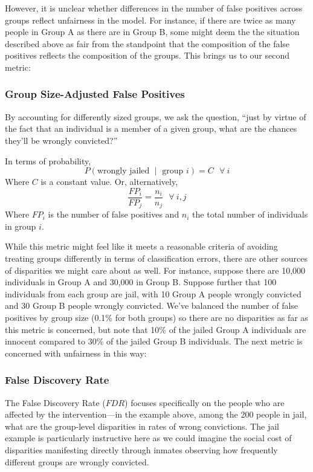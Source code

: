 \documentclass[]{krantz}
\begin{document}
However, it is unclear whether differences in the number of false
positives across groups reflect unfairness in the model. For instance,
if there are twice as many people in Group A as there are in Group B,
some might deem the the situation described above as fair from the
standpoint that the composition of the false positives reflects the
composition of the groups. This brings us to our second metric:

\subsubsection{Group Size-Adjusted False
Positives}\label{group-size-adjusted-false-positives}

By accounting for differently sized groups, we ask the question, ``just
by virtue of the fact that an individual is a member of a given group,
what are the chances they'll be wrongly convicted?''

In terms of probability,
\[P(\textrm{wrongly jailed $\mid$ group $i$}) = C~~~\forall~i\] Where
\(C\) is a constant value. Or, alternatively,
\[\frac{FP_i}{FP_j} = \frac{n_i}{n_j}~~~\forall~i,j\] Where \(FP_i\) is
the number of false positives and \(n_i\) the total number of
individuals in group \(i\).

While this metric might feel like it meets a reasonable criteria of
avoiding treating groups differently in terms of classification errors,
there are other sources of disparities we might care about as well. For
instance, suppose there are 10,000 individuals in Group A and 30,000 in
Group B. Suppose further that 100 individuals from each group are jail,
with 10 Group A people wrongly convicted and 30 Group B people wrongly
convicted. We've balanced the number of false positives by group size
(0.1\% for both groups) so there are no disparities as far as this
metric is concerned, but note that 10\% of the jailed Group A
individuals are innocent compared to 30\% of the jailed Group B
individuals. The next metric is concerned with unfairness in this way:

\subsubsection{False Discovery Rate}\label{false-discovery-rate}

The False Discovery Rate (\(FDR\)) focuses specifically on the people
who are affected by the intervention---in the example above, among the
200 people in jail, what are the group-level disparities in rates of
wrong convictions. The jail example is particularly instructive here as
we could imagine the social cost of disparities manifesting directly
through inmates observing how frequently different groups are wrongly
convicted.
\end{document}

